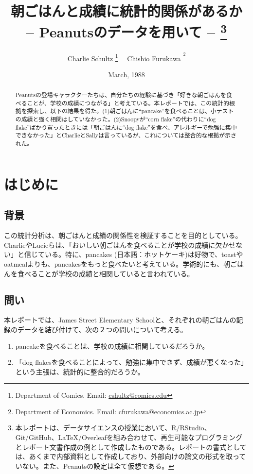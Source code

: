 \documentclass[xelatex,ja=standard]{bxjsarticle}
\title{朝ごはんと成績に統計的関係があるか \\ -- Peanutsのデータを用いて -- \thanks{本レポートは、データサイエンスの授業において、R/RStudio、Git/GitHub、LaTeX/Overleafを組み合わせて、再生可能なプログラミングとレポート文書作成の例として作成したものである。レポートの書式としては、あくまで内部資料として作成しており、外部向けの論文の形式を取っていない。また、Peanutsの設定は全て仮想である。}}
\author{Charlie Schultz
\thanks{Department of Comics. Email: \href{mailto: cshultz@comics.edu}{ cshultz@comics.edu}}  \ \  Chishio Furukawa
\textsuperscript\thanks{Department of Economics. Email:\href{mailto: cfurukawa@economics.ac.jp}{ cfurukawa@economics.ac.jp}}}
\date{March, 1988}
\begin{document}
\renewcommand\footnotelayout{\small}
\sffamily\mdseries

\maketitle

\vspace{-10pt}\begin{abstract}
\begin{spacing}{1}
\noindent 
Peanutsの登場キャラクターたちは、自分たちの経験に基づき「好きな朝ごはんを食べることが、学校の成績につながる」と考えている。本レポートでは、この統計的根拠を探索し、以下の結果を得た。(1)朝ごはんに``pancake''を食べることは、小テストの成績と強く相関はしていなかった。(2)Snoopyが``corn flake''の代わりに``dog flake''ばかり買ったときには「朝ごはんに``dog flake''を食べ、アレルギーで勉強に集中できなかった」とCharlieとSallyは言っているが、これについては整合的な根拠が示された。\\

\end{spacing}
\end{abstract}

\newpage

\section{はじめに}

\subsection{背景} 

この統計分析は、朝ごはんと成績の関係性を検証することを目的としている。CharlieやLucieらは、「おいしい朝ごはんを食べることが学校の成績に欠かせない」と信じている。特に、pancakes (日本語：ホットケーキ)は好物で\citep{peanutsbook}、toastやoatmealよりも、pancakesをもっと食べたいと考えている。学術的にも、朝ごはんを食べることが学校の成績と相関していると言われている\citep{Chandler1995}。

\subsection{問い}

本レポートでは、James Street Elementary Schoolと、それぞれの朝ごはんの記録のデータを結び付けて、次の２つの問いについて考える。

\begin{enumerate}
\item pancakeを食べることは、学校の成績に相関しているだろうか。
\item 「dog flakesを食べることによって、勉強に集中できず、成績が悪くなった」という主張は、統計的に整合的だろうか。
\end{enumerate}
\end{document}
